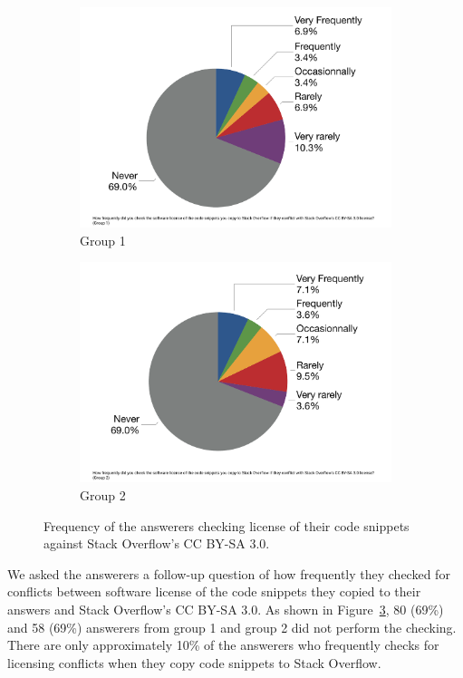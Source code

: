 \documentclass{svjour3}                     %
\begin{document}
\begin{figure}
	\begin{subfigure}{.5\textwidth}
		\centering
		\includegraphics[width=.75\linewidth]{survey_license_check_1}
		\caption{Group 1}
		\label{fig:survey_license_check_1}
	\end{subfigure}%
	\begin{subfigure}{.5\textwidth}
		\centering
		\includegraphics[width=.75\linewidth]{survey_license_check_2}
		\caption{Group 2}
		\label{fig:survey_license_check_2}
	\end{subfigure}
	\caption{Frequency of the answerers checking license of their code snippets against Stack Overflow's CC BY-SA 3.0.}
	\label{fig:survey_license_check}
\end{figure}

We asked the answerers a follow-up question of how frequently they checked for
conflicts between software license of the code snippets they copied to their
answers and Stack Overflow's CC BY-SA 3.0. As shown in
Figure~\ref{fig:survey_license_check}, 80 (69\%) and 58 (69\%) answerers from
group 1 and group 2 did not perform the checking. There are only approximately
10\% of the answerers who frequently checks for licensing conflicts when they
copy code snippets to Stack Overflow.
\end{document}
